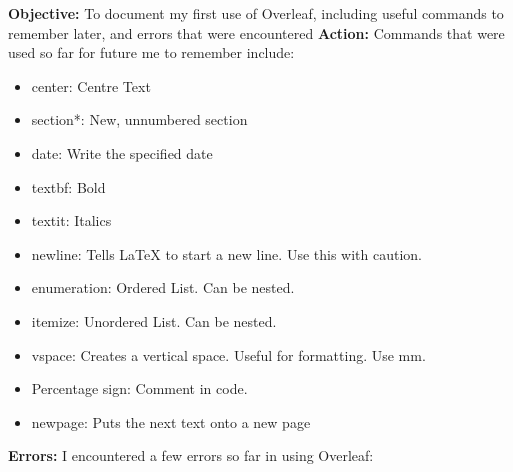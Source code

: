 \documentclass{article}
\begin{document}
\textbf{Objective:} To document my first use of Overleaf, including useful commands to remember later, and errors that were encountered
\newline
\textbf{Action:} Commands that were used so far for future me to remember include:
\begin{itemize}
    \item center: Centre Text
    \item section*: New, unnumbered section
    \item date: Write the specified date
    \item textbf: Bold
    \item textit: Italics
    \item newline: Tells LaTeX to start a new line. Use this with caution.
    \item enumeration: Ordered List. Can be nested.
    \item itemize: Unordered List. Can be nested.
    \item vspace: Creates a vertical space. Useful for formatting. Use mm.
    \item Percentage sign: Comment in code.
    \item newpage: Puts the next text onto a new page
\end{itemize}
\textbf{Errors:} I encountered a few errors so far in using Overleaf:
\end{document}
